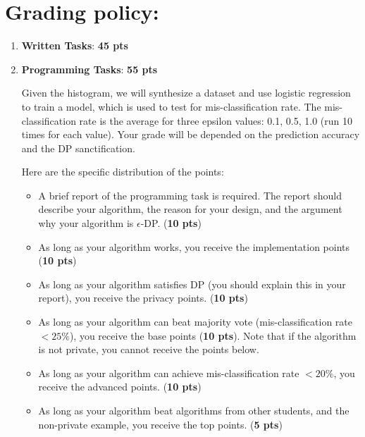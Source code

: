 \documentclass{article}
\begin{document}
\section{Grading policy:}
\begin{enumerate}
    \item \textbf{Written Tasks}: \textbf{45 pts}
    \item \textbf{Programming Tasks}: \textbf{55 pts}\par
        Given the histogram, we will synthesize a dataset and use logistic regression to train a model, which is used to test for mis-classification rate.  The mis-classification rate is the average for three epsilon values: 0.1, 0.5, 1.0 (run 10 times for each value). Your grade will be depended on the prediction accuracy and the DP sanctification.
        
        Here are the specific distribution of the points:
        \begin{itemize}
            \item A brief report of the programming task is required.  The report should describe your algorithm, the reason for your design, and the argument why your algorithm is $\epsilon$-DP. (\textbf{10 pts})
            \item As long as your algorithm works, you receive the implementation points (\textbf{10 pts})
            \item As long as your algorithm satisfies DP (you should explain this in your report), you receive the privacy points. (\textbf{10 pts})
            \item As long as your algorithm can beat majority vote (mis-classification rate $<25\%$), you receive the base points (\textbf{10 pts}).  Note that if the algorithm is not private, you cannot receive the points below.
            \item As long as your algorithm can achieve mis-classification rate $<20\%$, you receive the advanced points. (\textbf{10 pts})
            \item As long as your algorithm beat algorithms from other students, and the non-private example, you receive the top points. (\textbf{5 pts})	
        \end{itemize}
\end{enumerate}
\end{document}
